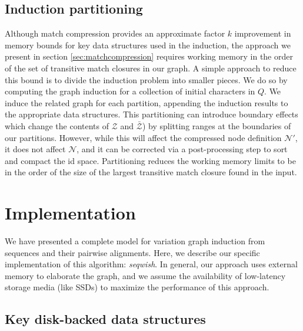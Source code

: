 \documentclass{bioinfo}
\theoremstyle{definition}
\begin{document}
\subsection{Induction partitioning}

Although match compression provides an approximate factor $k$ improvement in memory bounds for key data structures used in the induction, the approach we present in section \ref{sec:matchcompression} requires working memory in the order of the set of transitive match closures in our graph.
A simple approach to reduce this bound is to divide the induction problem into smaller pieces.
We do so by computing the graph induction for a collection of initial characters in $Q$.
We induce the related graph for each partition, appending the induction results to the appropriate data structures.
This partitioning can introduce boundary effects which change the contents of $\mathcal{Z}$ and $\bar{\mathcal{Z}}$) by splitting ranges at the boundaries of our partitions.
However, while this will affect the compressed node definition $\mathcal{N}'$, it does not affect $\mathcal{N}$, and it can be corrected via a post-processing step to sort and compact the id space.
Partitioning reduces the working memory limits to be in the order of the size of the largest transitive match closure found in the input.

\section{Implementation}

We have presented a complete model for variation graph induction from sequences and their pairwise alignments.
Here, we describe our specific implementation of this algorithm: \textit{seqwish}.
In general, our approach uses external memory to elaborate the graph, and we assume the availability of low-latency storage media (like SSDs) to maximize the performance of this approach.

\subsection{Key disk-backed data structures}
\end{document}
